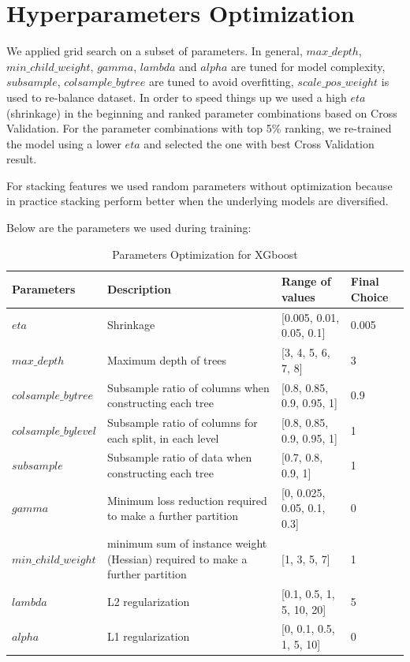 \documentclass[a4paper]{llncs}
\begin{document}

\section{Hyperparameters Optimization}
We applied grid search on a subset of parameters. In general, $max\_depth$, $min\_child\_weight$, $gamma$, $lambda$ and $alpha$ are tuned for model complexity,
 $subsample$, $colsample\_bytree$ are tuned to avoid overfitting, $scale\_pos\_weight$ is used to re-balance dataset.
 In order to speed things up we used a high $eta$ (shrinkage) in the beginning and ranked parameter combinations based on Cross Validation.
 For the parameter combinations with top 5\% ranking, we re-trained the model using a lower $eta$ and selected the one with best Cross Validation result.

For stacking features we used random parameters without optimization
 because in practice stacking perform better when the underlying models are diversified.

Below are the parameters we used during training:

\begin{table}[h!]
  \centering
  \caption{Parameters Optimization for XGboost}
  \label{tab:table1}
  \begin{tabular}{p{3cm}p{4.5cm}p{4cm}p{1cm}}
    \toprule
    Parameters & Description & Range of values & Final Choice \\
    \midrule
    $eta$ & Shrinkage & [0.005, 0.01, 0.05, 0.1] & 0.005 \\
    $max\_depth$ & Maximum depth of trees & [3, 4, 5, 6, 7, 8] & 3 \\
    $colsample\_bytree$ & Subsample ratio of columns when constructing each tree & [0.8, 0.85, 0.9, 0.95, 1] & 0.9 \\
    $colsample\_bylevel$ & Subsample ratio of columns for each split, in each level & [0.8, 0.85, 0.9, 0.95, 1] & 1 \\
    $subsample$ & Subsample ratio of data when constructing each tree & [0.7, 0.8, 0.9, 1] & 1 \\
    $gamma$ & Minimum loss reduction required to make a further partition & [0, 0.025, 0.05, 0.1, 0.3] & 0 \\
    $min\_child\_weight$ & minimum sum of instance weight (Hessian) required to make a further partition & [1, 3, 5, 7] & 1 \\
    $lambda$ & L2 regularization & [0.1, 0.5, 1, 5, 10, 20] & 5 \\
    $alpha$ & L1 regularization & [0, 0.1, 0.5, 1, 5, 10] & 0 \\
    \bottomrule
  \end{tabular}
\end{table}
\end{document}
